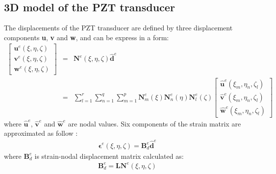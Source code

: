 \documentclass[materials,article,submit,moreauthors,pdftex]{Definitions/mdpi}
\begin{document}
\subsection{3D model of the PZT transducer}
\label{sec:3D_SEM}
The displacements of the PZT transducer are defined by three displacement components \textbf{u}, \textbf{v} and \textbf{w}, and can be express in a form:
\begin{eqnarray}
\left [ \begin{array}{c}
\textbf{u}^e(\xi,\eta,\zeta) \\
\textbf{v}^e(\xi,\eta,\zeta) \\
\textbf{w}^e(\xi,\eta,\zeta)
\end{array} \right]
& = & \textbf{N}^e(\xi,\eta, \zeta)\widehat{\textbf{d}}^e\nonumber\\
& = & \sum_{l=1}^r\sum_{n=1}^q\sum_{m=1}^p\textbf{N}_m^e(\xi)\textbf{N}_n^e(\eta)\textbf{N}_l^e(\zeta)
\left [ \begin{array}{c}
\widehat{\textbf{u}}^e(\xi_m,\eta_n,\zeta_l) \\
\widehat{\textbf{v}}^e(\xi_m,\eta_n,\zeta_l) \\
\widehat{\textbf{w}}^e(\xi_m,\eta_n,\zeta_l)
\end{array} \right]
\label{eq:3D_displ}
\end{eqnarray}
where \(\widehat{\textbf{u}}^e\), \(\widehat{\textbf{v}}^e\) and 
\(\widehat{\textbf{w}}^e\) are nodal values.
Six components of the strain matrix are approximated as follow \cite{kudela20093d}:
\begin{eqnarray}
\boldsymbol{\epsilon}^e(\xi,\eta,\zeta)=\textbf{B}_{d}^e\widehat{\textbf{d}}^e
\end{eqnarray}
where \(\textbf{B}_{d}^e\) is strain-nodal displacement matrix calculated as:
\begin{eqnarray}
\textbf{B}_{d}^e=\textbf{L}\textbf{N}^e(\xi,\eta,\zeta)
\end{eqnarray}
\end{document}
